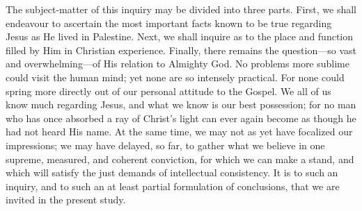 \documentclass[12pt,a5paper,oneside]{book}
\begin{document}
The subject-matter of this inquiry may 
be divided into three parts. First, we
shall endeavour to ascertain the most important 
facts known to be true regarding 
Jesus as He lived in Palestine. Next, we shall 
inquire as to the place and function filled by Him in Christian experience. Finally, there
remains the question---so vast and overwhelming---of
His relation to Almighty God. No 
problems more sublime could visit the human
mind; yet none are so intensely practical.
For none could spring more directly out of
our personal attitude to the Gospel. We all 
of us know much regarding Jesus, and what
we know is our best possession; for no man
who has once absorbed a ray of Christ's light
can ever again become as though he had not 
heard His name. At the same time, we may
not as yet have focalized our impressions;
we may have delayed, so far, to gather what
we believe in one supreme, measured, and
coherent conviction, for which we can make a
stand, and which will satisfy the just demands
of intellectual consistency. It is to such an
inquiry, and to such an at least partial formulation 
of conclusions, that we are invited in the
present study.
\end{document}
